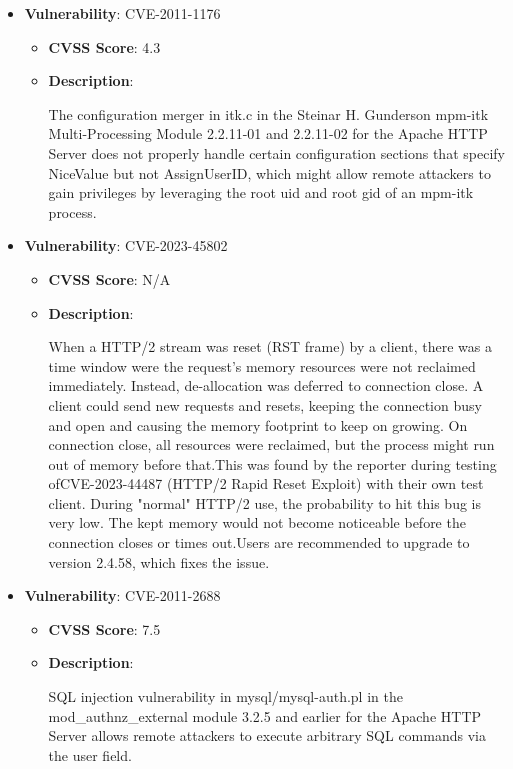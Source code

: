 \documentclass{article}
\begin{document}
\begin{itemize}
        \item \textbf{Vulnerability}: CVE-2011-1176
        \begin{itemize}
            \item \textbf{CVSS Score}:  4.3 
            \item \textbf{Description}:
            \parbox[t]{0.9\linewidth}{
                \ttfamily The configuration merger in itk.c in the Steinar H. Gunderson mpm-itk Multi-Processing Module 2.2.11-01 and 2.2.11-02 for the Apache HTTP Server does not properly handle certain configuration sections that specify NiceValue but not AssignUserID, which might allow remote attackers to gain privileges by leveraging the root uid and root gid of an mpm-itk process.
            }
        \end{itemize}
    
        \item \textbf{Vulnerability}: CVE-2023-45802
        \begin{itemize}
            \item \textbf{CVSS Score}:  N/A 
            \item \textbf{Description}:
            \parbox[t]{0.9\linewidth}{
                \ttfamily When a HTTP/2 stream was reset (RST frame) by a client, there was a time window were the request's memory resources were not reclaimed immediately. Instead, de-allocation was deferred to connection close. A client could send new requests and resets, keeping the connection busy and open and causing the memory footprint to keep on growing. On connection close, all resources were reclaimed, but the process might run out of memory before that.This was found by the reporter during testing ofCVE-2023-44487 (HTTP/2 Rapid Reset Exploit) with their own test client. During "normal" HTTP/2 use, the probability to hit this bug is very low. The kept memory would not become noticeable before the connection closes or times out.Users are recommended to upgrade to version 2.4.58, which fixes the issue.
            }
        \end{itemize}
    
        \item \textbf{Vulnerability}: CVE-2011-2688
        \begin{itemize}
            \item \textbf{CVSS Score}:  7.5 
            \item \textbf{Description}:
            \parbox[t]{0.9\linewidth}{
                \ttfamily SQL injection vulnerability in mysql/mysql-auth.pl in the mod\_authnz\_external module 3.2.5 and earlier for the Apache HTTP Server allows remote attackers to execute arbitrary SQL commands via the user field.
            }
        \end{itemize}
    

\end{itemize}
\end{document}
